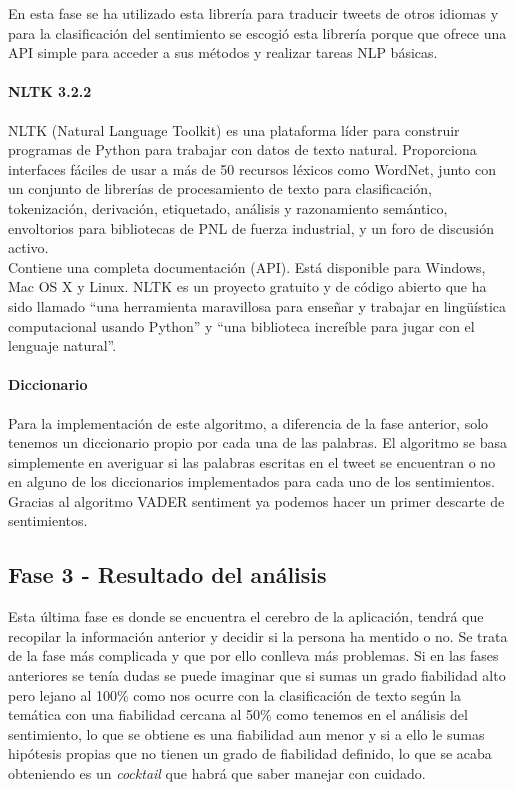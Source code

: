\documentclass[../all.tex]{subfiles}
\begin{document}
        	En esta fase se ha utilizado esta librería para traducir tweets de otros idiomas y para la clasificación del sentimiento se escogió esta librería porque que ofrece una API simple para acceder a sus métodos y realizar tareas NLP básicas.
        	
        \paragraph{NLTK 3.2.2}
			NLTK (Natural Language Toolkit) es una plataforma líder para construir programas de Python para trabajar con datos de texto natural. Proporciona interfaces fáciles de usar a más de 50 recursos léxicos como WordNet, junto con un conjunto de librerías de procesamiento de texto para clasificación, tokenización, derivación, etiquetado, análisis y razonamiento semántico, envoltorios para bibliotecas de PNL de fuerza industrial, y un foro de discusión activo\cite{NLTK}.\\
			
			Contiene una completa documentación (API). Está disponible para Windows, Mac OS X y Linux. NLTK es un proyecto gratuito y de código abierto que ha sido llamado ``una herramienta maravillosa para enseñar y trabajar en lingüística computacional usando Python'' y ``una biblioteca increíble para jugar con el lenguaje natural''.

        \paragraph{Diccionario}
        
            Para la implementación de este algoritmo, a diferencia de la fase anterior, solo tenemos un diccionario propio por cada una de las palabras. El algoritmo se basa simplemente en averiguar si las palabras escritas en el tweet se encuentran o no en alguno de los diccionarios implementados para cada uno de los sentimientos. Gracias al algoritmo VADER sentiment ya podemos hacer un primer descarte de sentimientos.
\newpage
\subsection{Fase 3 - Resultado del análisis}

		Esta última fase es donde se encuentra el cerebro de la aplicación, tendrá que recopilar la información anterior y decidir si la persona ha mentido o no. Se trata de la fase más complicada y que por ello conlleva más problemas. Si en las fases anteriores se tenía dudas se puede imaginar que si sumas un grado fiabilidad alto pero lejano al 100\% como nos ocurre con la clasificación de texto según la temática con una fiabilidad cercana al 50\% como tenemos en el análisis del sentimiento, lo que se obtiene es una fiabilidad aun menor y si a ello le sumas hipótesis propias que no tienen un grado de fiabilidad definido, lo que se acaba obteniendo es un \textit{cocktail} que habrá que saber manejar con cuidado.\\
		
\end{document}
